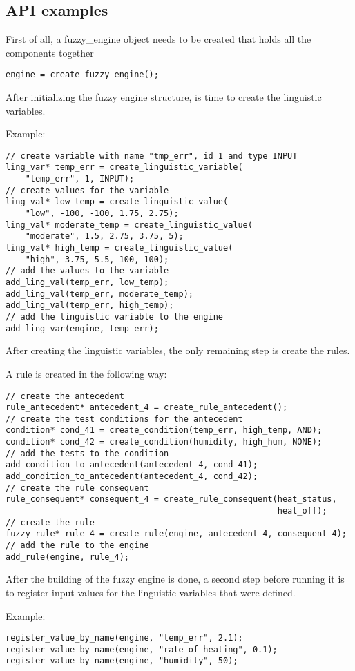 \subsection{API examples}

\qquad First of all, a fuzzy_engine object needs to be created that holds all the components together
\begin{lstlisting}[frame=single]
engine = create_fuzzy_engine();
\end{lstlisting}

\qquad After initializing the fuzzy engine structure, is time to create the linguistic variables. \par
Example:
\lstset{language=C}
\begin{lstlisting}[frame=single]
// create variable with name "tmp_err", id 1 and type INPUT
ling_var* temp_err = create_linguistic_variable(
    "temp_err", 1, INPUT);
// create values for the variable
ling_val* low_temp = create_linguistic_value(
    "low", -100, -100, 1.75, 2.75);
ling_val* moderate_temp = create_linguistic_value(
    "moderate", 1.5, 2.75, 3.75, 5);
ling_val* high_temp = create_linguistic_value(
    "high", 3.75, 5.5, 100, 100);
// add the values to the variable
add_ling_val(temp_err, low_temp);
add_ling_val(temp_err, moderate_temp);
add_ling_val(temp_err, high_temp);
// add the linguistic variable to the engine
add_ling_var(engine, temp_err);
\end{lstlisting}

\qquad After creating the linguistic variables, the only remaining step is create the rules. \par
A rule is created in the following way:
\begin{lstlisting}[frame=single]
// create the antecedent
rule_antecedent* antecedent_4 = create_rule_antecedent();
// create the test conditions for the antecedent
condition* cond_41 = create_condition(temp_err, high_temp, AND);
condition* cond_42 = create_condition(humidity, high_hum, NONE);
// add the tests to the condition
add_condition_to_antecedent(antecedent_4, cond_41);
add_condition_to_antecedent(antecedent_4, cond_42);
// create the rule consequent
rule_consequent* consequent_4 = create_rule_consequent(heat_status,
                                                       heat_off);
// create the rule
fuzzy_rule* rule_4 = create_rule(engine, antecedent_4, consequent_4);
// add the rule to the engine
add_rule(engine, rule_4);
\end{lstlisting}

\quad After the building of the fuzzy engine is done, a second step before running it is to register input
values for the linguistic variables that were defined. \par
Example:
\begin{lstlisting}[frame=single]
register_value_by_name(engine, "temp_err", 2.1);
register_value_by_name(engine, "rate_of_heating", 0.1);
register_value_by_name(engine, "humidity", 50);
\end{lstlisting}

